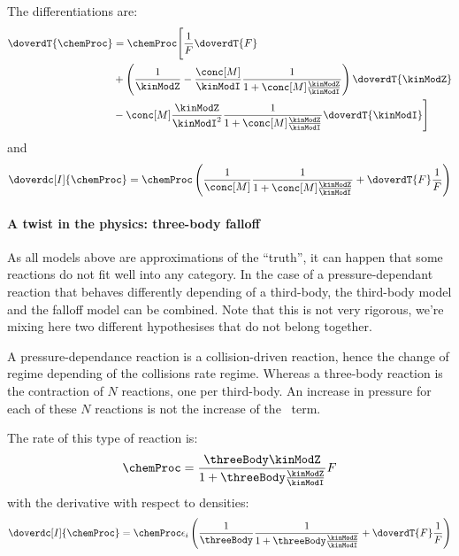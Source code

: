 The differentiations are:
\begin{equation}
\begin{split}
\doverdT{\chemProc} & = \chemProc 
                        \Bigg[\frac{1}{F}\doverdT{F} \\
                    &      + \left(\frac{1}{\kinModZ} - \frac{\conc[M]}{\kinModI}\frac{1}{1 + \conc[M]\frac{\kinModZ}{\kinModI}}\right)\doverdT{\kinModZ} \\
                    &      - \conc[M]\frac{\kinModZ}{\kinModI^2}\frac{1}{1 + \conc[M]\frac{\kinModZ}{\kinModI}}\doverdT{\kinModI}
                        \Bigg]
\end{split}
\label{Falloff:doverdT}
\end{equation}
and
\begin{equation}
\doverdc[I]{\chemProc} = \chemProc
                          \left(\frac{1}{\conc[M]} \frac{1}{1 + \conc[M]\frac{\kinModZ}{\kinModI}}
                               + \doverdT{F}\frac{1}{F}
                          \right)
\label{Falloff:doverdc}
\end{equation}

\paragraph{A twist in the physics: three-body falloff}

As all models above are approximations of the ``truth'', it can
happen that some reactions do not fit well into any category.
In the case of a pressure-dependant reaction that behaves
differently depending of a third-body, the third-body model
and the falloff model can be combined. Note that this is not
very rigorous, we're mixing here two different hypothesises that
do not belong together. 

A pressure-dependance reaction is a collision-driven reaction, hence
the change of regime depending of the collisions rate regime. Whereas
a three-body reaction is the contraction of $N$ reactions, one per
third-body. An increase in pressure for each of these $N$ reactions
is not the increase of the \threeBody\ term.

The rate of this type of reaction is:
\begin{equation}
\chemProc = \frac{\threeBody\kinModZ}{1 + \threeBody\frac{\kinModZ}{\kinModI}} F
\label{Falloff_Three:chem_proc}
\end{equation}
%
with the derivative with respect to densities:
%
\begin{equation}
\doverdc[I]{\chemProc} = \chemProc\epsilon_i
                          \left(\frac{1}{\threeBody} \frac{1}{1 + \threeBody\frac{\kinModZ}{\kinModI}}
                               + \doverdT{F}\frac{1}{F}
                          \right)
\label{Falloff_Three:doverdc}
\end{equation}

